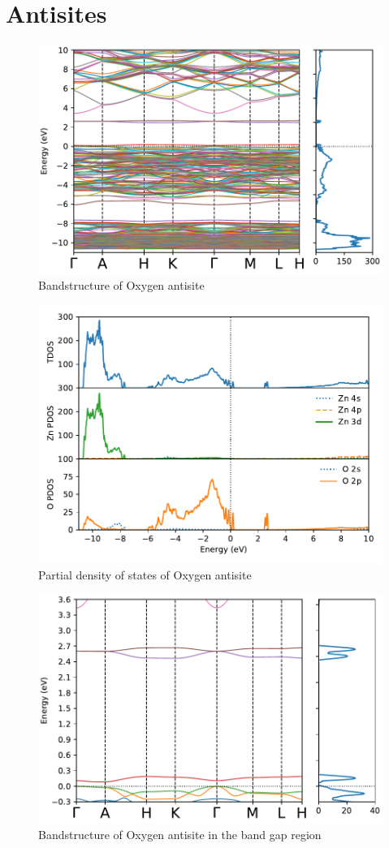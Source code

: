 \clearpage
\section{Antisites}

\begin{figure}[tbh!]
	\centering
	\includegraphics[width=0.7\linewidth]{"images/rnd/band-dos_O_anti"}
	\caption[Bandstructure of Oxygen antisite]{Bandstructure of Oxygen antisite}
\end{figure}

\begin{figure}[tbh!]
	\centering
	\includegraphics[width=0.7\linewidth]{"images/rnd/dos-pdos_O_anti"}
	\caption[Partial density of states of Oxygen antisite]{Partial density of states of Oxygen antisite}
\end{figure}

\begin{figure}[tbh!]
	\centering
	\includegraphics[width=0.7\linewidth]{"images/rnd/band-dos-close_O_anti"}
	\caption[Bandstructure of Oxygen antisite in the band gap region]{Bandstructure of Oxygen antisite  in the band gap region}
\end{figure}

